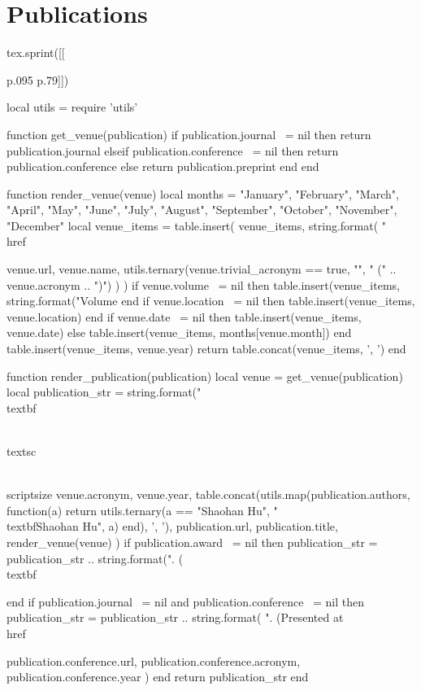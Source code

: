 \section{\sc Publications}

\begin{luacode*}
tex.sprint([[\begin{longtabu}{p{.095\resumewidth} p{.79\resumewidth}}]])

local utils = require 'utils'

function get_venue(publication)
    if publication.journal ~= nil then
        return publication.journal
    elseif publication.conference ~= nil then
        return publication.conference
    else
        return publication.preprint
    end
end

function render_venue(venue)
    local months = {"January", "February", "March", "April", "May", "June", "July", "August", "September", "October", "November", "December"}
    local venue_items = {}
    table.insert(
        venue_items,
        string.format(
            "\\href{%s}{\\textsf{%
            venue.url,
            venue.name,
            utils.ternary(venue.trivial_acronym == true, "", " (" .. venue.acronym .. ")")
        )
    )
    if venue.volume ~= nil then
        table.insert(venue_items, string.format("Volume %
    end
    if venue.location ~= nil then
        table.insert(venue_items, venue.location)
    end
    if venue.date ~= nil then
        table.insert(venue_items, venue.date)
    else
        table.insert(venue_items, months[venue.month])
    end
    table.insert(venue_items, venue.year)
    return table.concat(venue_items, ', ')
end

function render_publication(publication)
    local venue = get_venue(publication)
    local publication_str = string.format("\\textbf{\\textsc{\\scriptsize %
        venue.acronym,
        venue.year,
        table.concat(utils.map(publication.authors, function(a) return utils.ternary(a == "Shaohan Hu", "\\textbf{Shaohan Hu}", a) end), ', '),
        publication.url,
        publication.title,
        render_venue(venue)
    )
    if publication.award ~= nil then
        publication_str = publication_str .. string.format(". (\\textbf{%
    end
    if publication.journal ~= nil and publication.conference ~= nil then
        publication_str = publication_str .. string.format(
            ". (Presented at \\href{%s}{\\textsf{\\sc %
            publication.conference.url,
            publication.conference.acronym,
            publication.conference.year
        )
    end
    return publication_str
end

}}}}}
\end{longtabu}
\end{luacode*}
